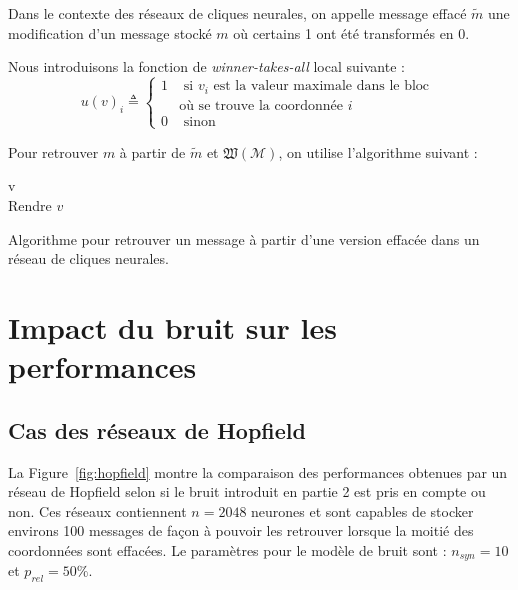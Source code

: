 \documentclass{gretsi}
\begin{document}
Dans le contexte des réseaux de cliques neurales, on appelle message effacé $\tilde{m}$ une modification d'un message stocké $m$ où certains 1 ont été transformés en 0.

Nous introduisons la fonction de \textit{winner-takes-all} local suivante :
\begin{equation}
u(v)_i \triangleq \left\{\begin{array}{ll} 1&\text{ si } v_i \text{ est la valeur maximale dans le bloc }\\&\text{où se trouve la coordonnée } i\\0&\text{ sinon}\end{array}\right.
\end{equation}
  
Pour retrouver $m$ à partir de $\tilde{m}$ et $\mathfrak{W}(\mathcal{M})$, on utilise l'algorithme suivant :

 \begin{algorithm}
   v \leftarrow {}\\
   Rendre $v$\;
   \caption{Algorithme pour retrouver un message à partir d'une version effacée dans un réseau de cliques neurales.}
   \label{alg:cliques}
\end{algorithm}

\section{Impact du bruit sur les performances}

\subsection{Cas des réseaux de Hopfield}

La Figure~\ref{fig:hopfield} montre la comparaison des performances obtenues par un réseau de Hopfield selon si le bruit introduit en partie 2 est pris en compte ou non. Ces réseaux contiennent $n=2048$ neurones et sont capables de stocker environs 100 messages de façon à pouvoir les retrouver lorsque la moitié des coordonnées sont effacées. Le paramètres pour le modèle de bruit sont : $n_{syn} = 10$ et $p_{rel} = 50\%$.
\end{document}

